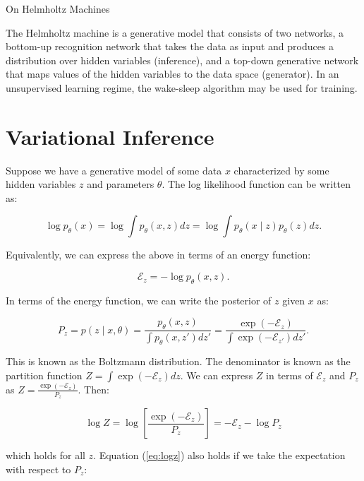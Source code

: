 \documentclass[11pt]{article}
\def\E{\mathcal{E}}
\begin{document}
\begin{center}
{\LARGE On Helmholtz Machines} 
\end{center}

The Helmholtz machine \cite{DayanHintonNealEtAl95} is a generative model that consists of two networks, a bottom-up recognition network that takes the data as input and produces a distribution over hidden variables (inference), and a top-down generative network that maps values of the hidden variables to the data space (generator). In an unsupervised learning regime, the wake-sleep algorithm may be used for training.

\section{Variational Inference}

Suppose we have a generative model of some data $x$ characterized by some hidden variables $z$ and parameters $\theta$. The log likelihood function can be written as:

\begin{equation}
\log p_\theta(x) = \log \int p_\theta(x, z) dz = \log \int p_\theta(x \mid z) p_\theta(z) dz.
\end{equation}

Equivalently, we can express the above in terms of an energy function:

\begin{equation}
\mathcal{E}_z= -\log p_\theta(x, z).
\label{eq:energy}
\end{equation} 

In terms of the energy function, we can write the posterior of $z$ given $x$ as:

\begin{equation}
P_z = p(z\mid x,\theta) = \frac{p_\theta(x, z)}{\int p_\theta(x, z') dz'}  = \frac{\exp(-\E_z)}{\int \exp(-\E_{z'}) dz'} .
\end{equation} 

This is known as the Boltzmann distribution. The denominator is known as the partition function $Z = \int \exp(-\mathcal{E}_{z}) dz$. We can express $Z$ in terms of $\mathcal{E}_z$ and $P_z$ as $Z = \frac{\exp(-\mathcal{E}_z)}{P_z}$. Then:

\begin{equation}
\log Z =  \log \left[ \frac{\exp(-\E_z)}{P_z} \right] = -\E_z -\log P_z
\label{eq:logz}
\end{equation}

which holds for all $z$. Equation (\ref{eq:logz}) also holds if we take the expectation with respect to $P_z$:
\end{document}
